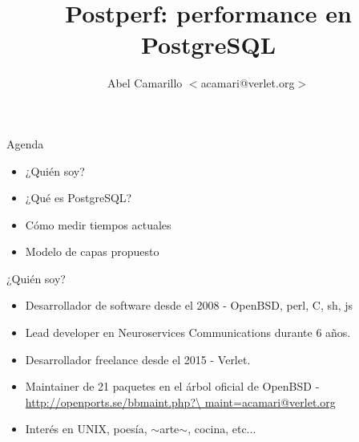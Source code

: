 \documentclass[11pt,spanish]{article}
\title{Postperf: performance en PostgreSQL}
\author{Abel Camarillo $<$acamari@verlet.org$>$}
\newcommand{\rowsp}[1][1em]{\vspace{#1}}
\newcommand{\hone}[1]{{\rowsp[0.3em]\noindent\Large #1 \rowsp[0.3em]}}
\newcommand{\myitm}[1]{\begin{itemize}#1\end{itemize}}
\begin{document}
\maketitle
\thispagestyle{empty}

\newpage

\hone{Agenda}

\myitm{
	\item ¿Quién soy?
	\item ¿Qué es PostgreSQL?
	\item Cómo medir tiempos actuales
	\item Modelo de capas propuesto
}

\newpage
\hone{¿Quién soy?}
\begin{Row}
\begin{Cell}{2}
\myitm{
	\item Desarrollador de software desde el 2008 - OpenBSD, perl, C, sh, js
	\item Lead developer en Neuroservices Communications durante 6 años.
	\item Desarrollador freelance desde el 2015 - Verlet.
	\item Maintainer de 21 paquetes en el árbol oficial de OpenBSD -
	\href{http://openports.se/bbmaint.php?maint=acamari@verlet.org}{
	      http://openports.se/bbmaint.php?\textbackslash{} maint=acamari@verlet.org}
	\item Interés en UNIX, poesía, $\sim$arte$\sim$, cocina, etc...
}
\end{Cell}


\end{Row}
\end{document}
